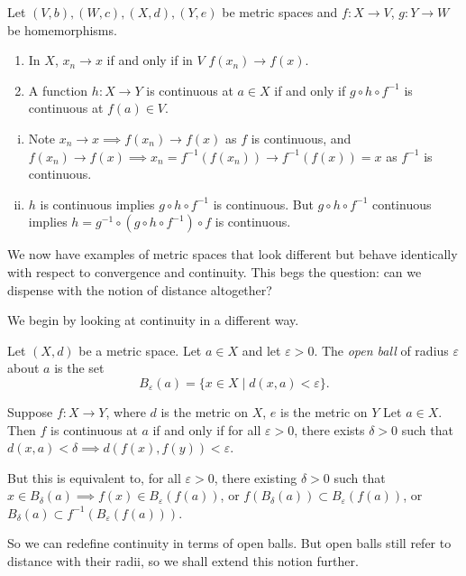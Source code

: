 \documentclass[12pt]{article}
\begin{document}
\begin{proposition}
	Let $(V, b), (W, c), (X, d), (Y, e)$ be metric spaces and $f : X \to V$, $g : Y \to W$ be homemorphisms.
	\begin{enumerate}[\normalfont(i)]
		\item In $X$, $x_n \to x$ if and only if in $V$ $f(x_n) \to f(x)$.
		\item A function $h : X \to Y$ is continuous at $a \in X$ if and only if $g \circ h \circ f^{-1}$ is continuous at $f(a) \in V$.
	\end{enumerate}
\end{proposition}

\begin{proofbox}
\begin{enumerate}[(i)]
	\item Note $x_n \to x \implies f(x_n) \to f(x)$ as $f$ is continuous, and $f(x_n) \to f(x) \implies x_n = f^{-1}(f(x_n)) \to f^{-1}(f(x)) = x$ as $f^{-1}$ is continuous.
	\item $h$ is continuous implies $g \circ h \circ f^{-1}$ is continuous. But $g \circ h \circ f^{-1}$ continuous implies $h = g^{-1} \circ( g \circ h \circ f^{-1}) \circ f$ is continuous.
\end{enumerate}
\end{proofbox}

We now have examples of metric spaces that look different but behave identically with respect to convergence and continuity. This begs the question: can we dispense with the notion of distance altogether?

We begin by looking at continuity in a different way.

\begin{definition}
	Let $(X, d)$ be a metric space. Let $a \in X$ and let $\varepsilon > 0$. The \textit{open ball} of radius $\varepsilon$ about $a$ is the set
	\[
		B_{\varepsilon}(a) = \{x \in X \mid d(x, a) < \varepsilon\}
	.\]
\end{definition}

\begin{remark}
	Suppose $f : X \to Y$, where $d$ is the metric on $X$, $e$ is the metric on $Y$ Let $a \in X$. Then $f$ is continuous at $a$ if and only if for all $\varepsilon > 0$, there exists $\delta > 0$ such that $d(x, a) < \delta \implies d(f(x), f(y)) < \varepsilon$.

	But this is equivalent to, for all $\varepsilon > 0$, there existing $\delta > 0$ such that $x \in B_{\delta}(a) \implies f(x) \in B_{\varepsilon}(f(a))$, or $f(B_{\delta}(a)) \subset B_{\varepsilon}(f(a))$, or $B_{\delta}(a) \subset f^{-1}(B_{\varepsilon}(f(a)))$.

	So we can redefine continuity in terms of open balls. But open balls still refer to distance with their radii, so we shall extend this notion further.
\end{remark}
\end{document}

